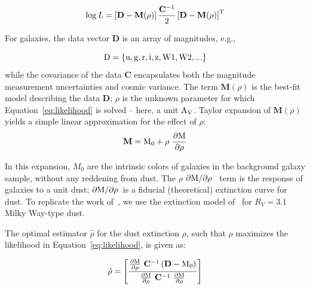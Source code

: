 \documentclass[11pt, oneside]{article}   	%
\newcommand{\dMdp}{\rm \frac{\partial M}{\partial \rho}}
\newcommand{\dMinline}{$\rm \partial M / \partial \rho$}
\begin{document}
\begin{equation}\label{eq:likelihood}
\log L = \rm \left [\mathbf{D} - \mathbf{M}(\rho)\right ] \frac{\mathbf{C}^{-1}}{2} \left[\mathbf{D} - \mathbf{M}(\rho)\right ]^{\rm T}
\end{equation}

For galaxies, the data vector $\mathbf{D}$ is an array of magnitudes, e.g.,

\begin{equation}\label{eq:data_vector}
\mathbf{\rm D} = \{\rm u,g,r,i,z,W1,W2,...\}
\end{equation}
while the covariance of the data $\mathbf{C}$ encapsulates both the magnitude measurement uncertainties and cosmic variance. The term $\mathbf{M}(\rho)$ is the best-fit model describing the data $\mathbf{D}$; $\rho$ is the unknown parameter for which Equation~\ref{eq:likelihood} is solved -- here, a unit $\rm A_V$. Taylor expansion of $\mathbf{M}(\rho)$ yields a simple linear approximation for the effect of $\rho$:
\begin{equation}\label{model}
\rm \mathbf{M} = M_0 + \rho\ \dMdp
\end{equation}
 
 In this expansion, $M_0$ are the intrinsic colors of galaxies in the background galaxy sample, without any reddening from dust. The $\rho$ \dMinline~ term is the response of galaxies to a unit dust; \dMinline~is a fiducial (theoretical) extinction curve for dust. To replicate the work of~\cite{menard2010measuring}, we use the extinction model of~\cite{fitzpatrick1999correcting} for $R_V = 3.1$ Milky Way-type dust. 

 The optimal estimator $\hat{\rho}$ for the dust extinction $\rho$, such that $\rho$ maximizes the likelihood in Equation~\ref{eq:likelihood}, is given as: 

\begin{equation}
\hat{\rho} = \rm \left[ \frac{ \dMdp \ \mathbf{C}^{-1} \left (\mathbf{D} - M_0 \right )} {\dMdp\ \mathbf{C}^{-1 }\ \dMdp} \right ] \label{eq:estimator}
\end{equation}
\end{document}
